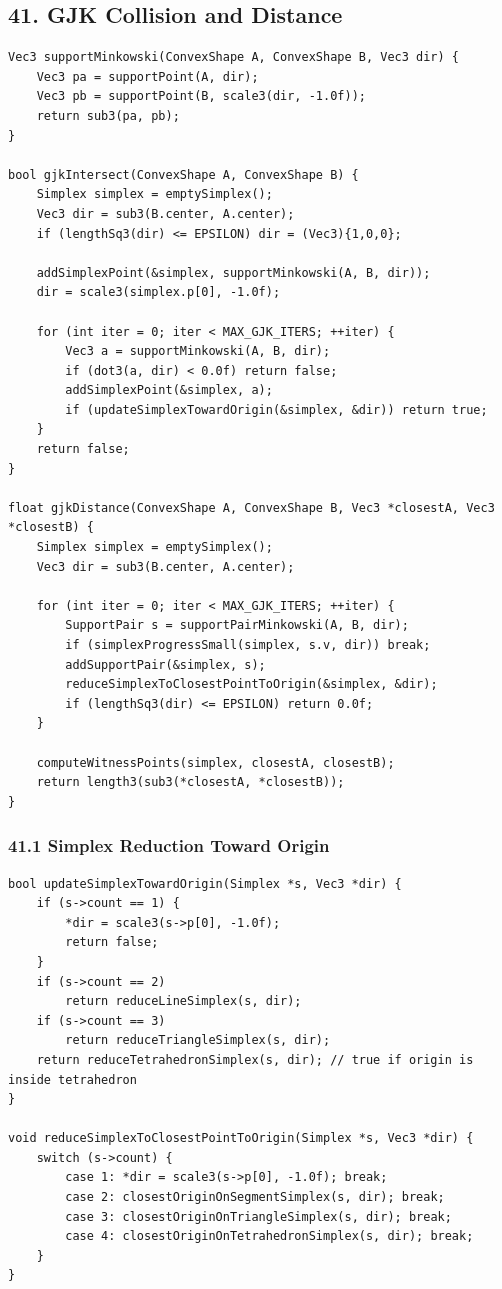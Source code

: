 \documentclass[10pt,letterpaper]{article}
\begin{document}
\subsection*{41. GJK Collision and Distance}

\begin{verbatim}
Vec3 supportMinkowski(ConvexShape A, ConvexShape B, Vec3 dir) {
    Vec3 pa = supportPoint(A, dir);
    Vec3 pb = supportPoint(B, scale3(dir, -1.0f));
    return sub3(pa, pb);
}

bool gjkIntersect(ConvexShape A, ConvexShape B) {
    Simplex simplex = emptySimplex();
    Vec3 dir = sub3(B.center, A.center);
    if (lengthSq3(dir) <= EPSILON) dir = (Vec3){1,0,0};

    addSimplexPoint(&simplex, supportMinkowski(A, B, dir));
    dir = scale3(simplex.p[0], -1.0f);

    for (int iter = 0; iter < MAX_GJK_ITERS; ++iter) {
        Vec3 a = supportMinkowski(A, B, dir);
        if (dot3(a, dir) < 0.0f) return false;
        addSimplexPoint(&simplex, a);
        if (updateSimplexTowardOrigin(&simplex, &dir)) return true;
    }
    return false;
}

float gjkDistance(ConvexShape A, ConvexShape B, Vec3 *closestA, Vec3 *closestB) {
    Simplex simplex = emptySimplex();
    Vec3 dir = sub3(B.center, A.center);

    for (int iter = 0; iter < MAX_GJK_ITERS; ++iter) {
        SupportPair s = supportPairMinkowski(A, B, dir);
        if (simplexProgressSmall(simplex, s.v, dir)) break;
        addSupportPair(&simplex, s);
        reduceSimplexToClosestPointToOrigin(&simplex, &dir);
        if (lengthSq3(dir) <= EPSILON) return 0.0f;
    }

    computeWitnessPoints(simplex, closestA, closestB);
    return length3(sub3(*closestA, *closestB));
}
\end{verbatim}


\subsubsection*{41.1 Simplex Reduction Toward Origin}

\begin{verbatim}
bool updateSimplexTowardOrigin(Simplex *s, Vec3 *dir) {
    if (s->count == 1) {
        *dir = scale3(s->p[0], -1.0f);
        return false;
    }
    if (s->count == 2)
        return reduceLineSimplex(s, dir);
    if (s->count == 3)
        return reduceTriangleSimplex(s, dir);
    return reduceTetrahedronSimplex(s, dir); // true if origin is inside tetrahedron
}

void reduceSimplexToClosestPointToOrigin(Simplex *s, Vec3 *dir) {
    switch (s->count) {
        case 1: *dir = scale3(s->p[0], -1.0f); break;
        case 2: closestOriginOnSegmentSimplex(s, dir); break;
        case 3: closestOriginOnTriangleSimplex(s, dir); break;
        case 4: closestOriginOnTetrahedronSimplex(s, dir); break;
    }
}
\end{verbatim}
\end{document}
